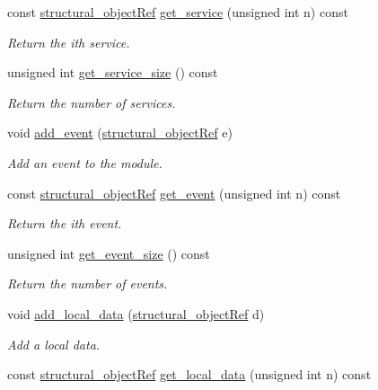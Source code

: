 \begin{DoxyCompactItemize}
const \hyperlink{structural__objects_8hpp_a8ea5f8cc50ab8f4c31e2751074ff60b2}{structural\+\_\+object\+Ref} \hyperlink{classmodule_a9b9c1372c038a2e6c89160422c68643e}{get\+\_\+service} (unsigned int n) const
\begin{DoxyCompactList}\small\item\em Return the ith service. \end{DoxyCompactList}\item 
unsigned int \hyperlink{classmodule_af9e0fc6992cc24221a6ab32b4acafda3}{get\+\_\+service\+\_\+size} () const
\begin{DoxyCompactList}\small\item\em Return the number of services. \end{DoxyCompactList}\item 
void \hyperlink{classmodule_a85a9c0cad60665cfae99c1fd8ff82332}{add\+\_\+event} (\hyperlink{structural__objects_8hpp_a8ea5f8cc50ab8f4c31e2751074ff60b2}{structural\+\_\+object\+Ref} e)
\begin{DoxyCompactList}\small\item\em Add an event to the module. \end{DoxyCompactList}\item 
const \hyperlink{structural__objects_8hpp_a8ea5f8cc50ab8f4c31e2751074ff60b2}{structural\+\_\+object\+Ref} \hyperlink{classmodule_a386874df14ff004219fde77c17010aa2}{get\+\_\+event} (unsigned int n) const
\begin{DoxyCompactList}\small\item\em Return the ith event. \end{DoxyCompactList}\item 
unsigned int \hyperlink{classmodule_a80d69c7772202adc1847e20198473f0c}{get\+\_\+event\+\_\+size} () const
\begin{DoxyCompactList}\small\item\em Return the number of events. \end{DoxyCompactList}\item 
void \hyperlink{classmodule_a9571a7cbf910e5fe74273c0a4a2d10be}{add\+\_\+local\+\_\+data} (\hyperlink{structural__objects_8hpp_a8ea5f8cc50ab8f4c31e2751074ff60b2}{structural\+\_\+object\+Ref} d)
\begin{DoxyCompactList}\small\item\em Add a local data. \end{DoxyCompactList}\item 
const \hyperlink{structural__objects_8hpp_a8ea5f8cc50ab8f4c31e2751074ff60b2}{structural\+\_\+object\+Ref} \hyperlink{classmodule_a9c40c5d1b329a955c18f72d35ae2625e}{get\+\_\+local\+\_\+data} (unsigned int n) const

\end{DoxyCompactItemize}
